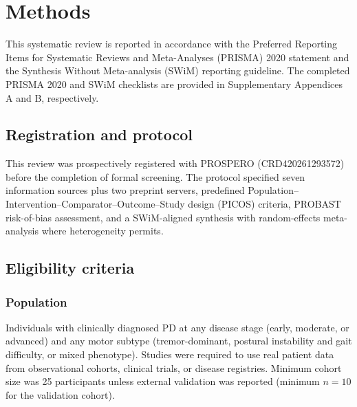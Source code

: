 \section{Methods}
\label{sr:sec:methods}

This systematic review is reported in accordance with the Preferred Reporting Items for Systematic Reviews and Meta-Analyses (PRISMA) 2020 statement\cite{page2021} and the Synthesis Without Meta-analysis (SWiM) reporting guideline\cite{campbell2020}. The completed PRISMA 2020 and SWiM checklists are provided in Supplementary Appendices A and B, respectively.

\subsection{Registration and protocol}
\label{sr:sec:methods:registration}

This review was prospectively registered with PROSPERO (CRD420261293572) before the completion of formal screening. The protocol specified seven information sources plus two preprint servers, predefined Population--Intervention--Comparator--Outcome--Study design (PICOS) criteria, PROBAST risk-of-bias assessment, and a SWiM-aligned synthesis with random-effects meta-analysis where heterogeneity permits.

\subsection{Eligibility criteria}
\label{sr:sec:methods:eligibility}

\subsubsection{Population}
Individuals with clinically diagnosed PD at any disease stage (early, moderate, or advanced) and any motor subtype (tremor-dominant, postural instability and gait difficulty, or mixed phenotype). Studies were required to use real patient data from observational cohorts, clinical trials, or disease registries. Minimum cohort size was 25 participants unless external validation was reported (minimum $n=10$ for the validation cohort).

